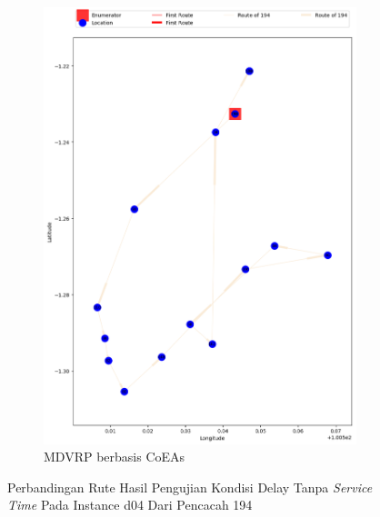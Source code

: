 \begin{figure}[H]
	\centering
	\begin{subfigure}[t]{\textwidth}
		\centering
		\includegraphics[width=\textwidth]{Resources/Images/delayed_4/real_m15_n100_delayed_4_194_coes}
		\caption{MDVRP berbasis CoEAs}
		\label{fig:real_m15_n100_delayed_4_194_coes}
	\end{subfigure}
	\caption{Perbandingan Rute Hasil Pengujian Kondisi Delay Tanpa \textit{Service Time} Pada Instance d04 Dari Pencacah 194}
	\label{fig:real_m15_n100_delayed_4_194}
\end{figure}


